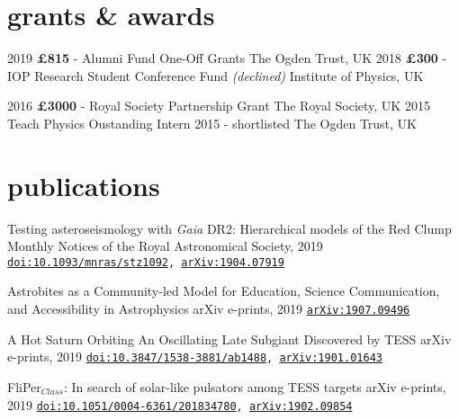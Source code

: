 \documentclass[]{k-cv} %
\begin{document}
\section{grants \& awards}

\begin{entrylist}
\centrythree
{2019}
{\textbf{\pounds 815} - Alumni Fund One-Off Grants}
{The Ogden Trust, UK}
\centrythree
{2018}
{\textbf{\pounds 300} - IOP Research Student Conference Fund \emph{(declined)}}
{Institute of Physics, UK}

\centrythree
{2016}
{\textbf{\pounds 3000} - Royal Society Partnership Grant}
{The Royal Society, UK}
\centrythree
{2015}
{Teach Physics Oustanding Intern 2015 - shortlisted}
{The Ogden Trust, UK}

\end{entrylist}

\section{publications}
{Testing asteroseismology with \textit{Gaia} DR2: Hierarchical models of the Red Clump}
{Monthly Notices of the Royal Astronomical Society, 2019}
{\texttt{\href{https://academic.oup.com/mnras/article-abstract/486/3/3569/5475128}{doi:10.1093/mnras/stz1092}, \href{https://arxiv.org/abs/1904.07919}{arXiv:1904.07919}}}

{Astrobites as a Community-led Model for Education, Science Communication, and Accessibility in Astrophysics}
{arXiv e-prints, 2019}
{\texttt{\href{https://arxiv.org/abs/1907.09496}{arXiv:1907.09496}}}

{{A Hot Saturn Orbiting An Oscillating Late Subgiant Discovered by TESS}}
{arXiv e-prints, 2019}
{\texttt{\href{https://iopscience.iop.org/article/10.3847/1538-3881/ab1488}{doi:10.3847/1538-3881/ab1488}, \href{https://arxiv.org/abs/1901.01643}{arXiv:1901.01643}}}

{FliPer$_{Class}$: In search of solar-like pulsators among TESS targets}
{arXiv e-prints, 2019}
{\texttt{\href{https://www.aanda.org/articles/aa/abs/2019/04/aa34780-18/aa34780-18.html}{doi:10.1051/0004-6361/201834780}, \href{https://arxiv.org/abs/1902.09854}{arXiv:1902.09854}}}
\end{document}
